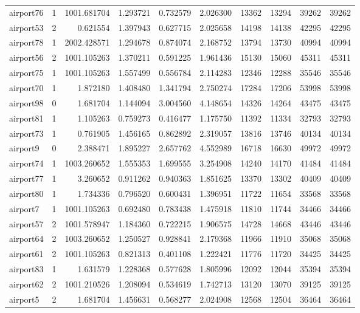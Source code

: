 \begin{longtable}{|l|r|r|r|r|r|r|r|r|r|}
airport76 & 1 & 1001.681704 & 1.293721 & 0.732579 & 2.026300 & 13362 & 13294 & 39262 & 39262 \\
airport53 & 2 & 0.621554 & 1.397943 & 0.627715 & 2.025658 & 14198 & 14138 & 42295 & 42295 \\
airport78 & 1 & 2002.428571 & 1.294678 & 0.874074 & 2.168752 & 13794 & 13730 & 40994 & 40994 \\
airport56 & 2 & 1001.105263 & 1.370211 & 0.591225 & 1.961436 & 15130 & 15060 & 45311 & 45311 \\
airport75 & 1 & 1001.105263 & 1.557499 & 0.556784 & 2.114283 & 12346 & 12288 & 35546 & 35546 \\
airport70 & 1 & 1.872180 & 1.408480 & 1.341794 & 2.750274 & 17284 & 17206 & 53998 & 53998 \\
airport98 & 0 & 1.681704 & 1.144094 & 3.004560 & 4.148654 & 14326 & 14264 & 43475 & 43475 \\
airport81 & 1 & 1.105263 & 0.759273 & 0.416477 & 1.175750 & 11392 & 11334 & 32793 & 32793 \\
airport73 & 1 & 0.761905 & 1.456165 & 0.862892 & 2.319057 & 13816 & 13746 & 40134 & 40134 \\
airport9 & 0 & 2.388471 & 1.895227 & 2.657762 & 4.552989 & 16718 & 16630 & 49972 & 49972 \\
airport74 & 1 & 1003.260652 & 1.555353 & 1.699555 & 3.254908 & 14240 & 14170 & 41484 & 41484 \\
airport77 & 1 & 3.260652 & 0.911262 & 0.940363 & 1.851625 & 13370 & 13302 & 40409 & 40409 \\
airport80 & 1 & 1.734336 & 0.796520 & 0.600431 & 1.396951 & 11722 & 11654 & 33568 & 33568 \\
airport7 & 1 & 1001.105263 & 0.692480 & 0.783438 & 1.475918 & 11810 & 11744 & 34466 & 34466 \\
airport57 & 2 & 1001.578947 & 1.184360 & 0.722215 & 1.906575 & 14728 & 14668 & 43446 & 43446 \\
airport64 & 2 & 1003.260652 & 1.250527 & 0.928841 & 2.179368 & 11966 & 11910 & 35068 & 35068 \\
airport61 & 2 & 1001.105263 & 0.821313 & 0.401108 & 1.222421 & 11776 & 11720 & 34425 & 34425 \\
airport83 & 1 & 1.631579 & 1.228368 & 0.577628 & 1.805996 & 12092 & 12044 & 35394 & 35394 \\
airport62 & 2 & 1001.210526 & 1.208094 & 0.534619 & 1.742713 & 13120 & 13070 & 39125 & 39125 \\
airport5 & 2 & 1.681704 & 1.456631 & 0.568277 & 2.024908 & 12568 & 12504 & 36464 & 36464 \\

\end{longtable}

